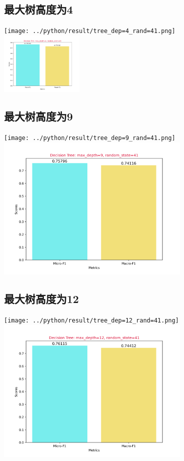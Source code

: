 \documentclass{article}
\begin{document}
\subsection{最大树高度为4}
\begin{center}
    \texttt{[image: ../python/result/tree\_dep=4\_rand=41.png]}\\
    \includegraphics[width=0.3\textwidth]{../python/result/score_dep=4_rand=41.png}\\
\end{center}
\subsection{最大树高度为9}
\begin{center}
    \texttt{[image: ../python/result/tree\_dep=9\_rand=41.png]}\\
    \includegraphics[width=0.7\textwidth]{../python/result/score_dep=9_rand=41.png}\\
\end{center}

\subsection{最大树高度为12}
\begin{center}
    \texttt{[image: ../python/result/tree\_dep=12\_rand=41.png]}\\
    \includegraphics[width=0.7\textwidth]{../python/result/score_dep=12_rand=41.png}\\
\end{center}
\end{document}
